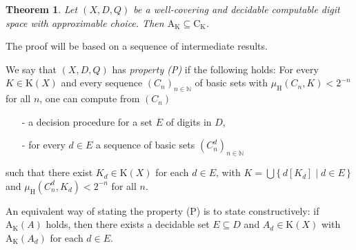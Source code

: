 \documentclass[microtype]{jloganal}
\theoremstyle{plain}
\newtheorem{theorem}{Theorem}[section]
\theoremstyle{definition}
\newcommand{\NN}{\mathbb{N}}
\newcommand{\coco}{\mathrm{C}}
\newcommand{\compact}{\mathrm{K}}
\newcommand{\hdm}{\mu_{\mathrm H}}
\newcommand{\cauchy}{\mathrm{A}}
\begin{document}
\begin{theorem}
\label{thm-ak-sub-ck}
Let $(X,D,Q)$ be a well-covering and decidable computable digit space with approximable choice. Then $\cauchy_{\compact} \subseteq \coco_{\compact}$.
\end{theorem}
The proof will be based on a sequence of intermediate results.

We say that $(X,D,Q)$ has \emph{property (P)} if the 
following holds: For every $K \in \compact(X)$ and every sequence 
$(C_n)_{n\in\NN}$ of basic sets
with $\hdm(C_n,K) < 2^{-n}$ for all $n$, one can compute from $(C_n)$
\begin{itemize}
\item[-] a decision procedure for a set $E$ of digits in $D$,
\item[-] for every $d \in E$ a sequence of basic sets $(C^d_n)_{n\in\NN}$
\end{itemize}
such that there exist $K_d \in \compact(X)$ for each $d \in E$, with
$K = \bigcup \{\,d[K_d] \mid d \in E\,\}$ and $\hdm(C^d_n,K_d) < 2^{-n}$ for all 
$n$.

An equivalent way of stating the property (P) is to state constructively: 
if $\cauchy_\compact(A)$ holds, then there exists a decidable set 
$E\subseteq D$ and $A_d \in \compact(X)$ with $\cauchy_\compact(A_d)$ 
for each $d \in E$. 
\end{document}
